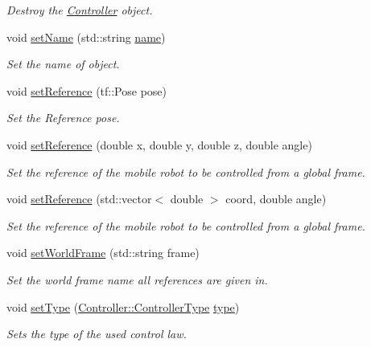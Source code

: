 \begin{DoxyCompactItemize}
\begin{DoxyCompactList}\small\item\em Destroy the \hyperlink{classController}{Controller} object. \end{DoxyCompactList}\item 
void \hyperlink{classController_a177d0d6cd7cdb7784ae9c506debfa2c6}{set\+Name} (std\+::string \hyperlink{classController_af81f22d8b64d915769acfb8e8d89e0c8}{name})
\begin{DoxyCompactList}\small\item\em Set the name of object. \end{DoxyCompactList}\item 
void \hyperlink{classController_a7d989fe559c8e852eedb464b4a006748}{set\+Reference} (tf\+::\+Pose pose)
\begin{DoxyCompactList}\small\item\em Set the Reference pose. \end{DoxyCompactList}\item 
void \hyperlink{classController_a156a66bd7cd6340106accbb982b6238b}{set\+Reference} (double x, double y, double z, double angle)
\begin{DoxyCompactList}\small\item\em Set the reference of the mobile robot to be controlled from a global frame. \end{DoxyCompactList}\item 
void \hyperlink{classController_ae86ed49c452a9e94568312ef743aa082}{set\+Reference} (std\+::vector$<$ double $>$ coord, double angle)
\begin{DoxyCompactList}\small\item\em Set the reference of the mobile robot to be controlled from a global frame. \end{DoxyCompactList}\item 
void \hyperlink{classController_adf25339eadd9b31bc1d6b3e47395942e}{set\+World\+Frame} (std\+::string frame)
\begin{DoxyCompactList}\small\item\em Set the world frame name all references are given in. \end{DoxyCompactList}\item 
void \hyperlink{classController_a25202c469ad65696761242dce4e28d76}{set\+Type} (\hyperlink{classController_aa6d956c4c220461a4152415ffa78690a}{Controller\+::\+Controller\+Type} \hyperlink{classController_a17792cff397dc69baca568c7d03f2fc8}{type})
\begin{DoxyCompactList}\small\item\em Sets the type of the used control law. \end{DoxyCompactList}\item 

\end{DoxyCompactItemize}
